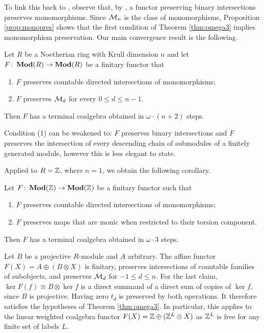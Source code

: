 \documentclass[runningheads]{llncs}
\begin{document}
To link this back to \cite{AdamekEA25}, observe that, by \cite[Rem.~2.6]{AdamekEA25}, a functor preserving binary intersections preserves monomorphisms. 
 Since $\mathcal{M}_n$ is the class of monomorphisms, Proposition \ref{prop:monopres} shows that the first condition of Theorem \ref{thm:omega3} implies monomorphism preservation.
Our  main convergence result is the following.
\begin{theorem}
\label{thm:omega3}
Let $R$ be a Noetherian ring with Krull dimension $n$ and let
$F\colon \operatorname{\mathbf{Mod}}(R) \to \operatorname{\mathbf{Mod}}(R)$ be a finitary functor that
\begin{enumerate}
\item $F$ preserves countable directed intersections of monomorphisms;
\item $F$ preserves $\mathcal{M}_d$ for every $0\leq d \leq n-1$.
\end{enumerate}
Then $F$ has a terminal coalgebra obtained in $\omega\cdot (n+2)$ steps.
\end{theorem}
\begin{remark}
Condition (1) can be weakened to: $F$ preserves binary intersections and $F$ preserves the intersection of every descending chain of submodules of a finitely generated module, however this is less elegant to state.
\end{remark}
 Applied to $R = \mathbb{Z}$, where $n=1$, we obtain the following corollary.
\begin{corollary}
\label{thm:omega3Z}
Let $F\colon \operatorname{\mathbf{Mod}}(\mathbb{Z}) \to \operatorname{\mathbf{Mod}}(\mathbb{Z})$ be a finitary functor such that
\begin{enumerate}
\item $F$ preserves countable directed intersections of monomorphisms;
\item $F$ preserves maps that are monic when restricted to their torsion component.
\end{enumerate}
Then $F$ has a terminal coalgebra obtained in $\omega\cdot 3$ steps.
\end{corollary}
\begin{example}
Let $B$ be a projective $R$-module and $A$ arbitrary. The affine functor $F(X) = A \oplus (B \otimes X)$ is finitary, preserves intersections of countable families of subobjects, and preserves $\mathcal{M}_d$ for $-1 \leq d \leq n$. 
For the last claim, $\ker F(f) \cong B \otimes \ker f$ is a direct summand of a direct sum of copies of $\ker f$, since $B$ is projective.
Having zero $t_d$ is preserved by both operations.
It therefore satisfies the hypotheses of Theorem \ref{thm:omega3}. 
In particular, this applies to the linear weighted coalgebra functor $F(X) = \mathbb{Z} \oplus ( \mathbb{Z}^{L} \otimes X)$ as  $\mathbb{Z}^{L}$ is free for any finite set of labels $L$.
\end{example}
\end{document}
